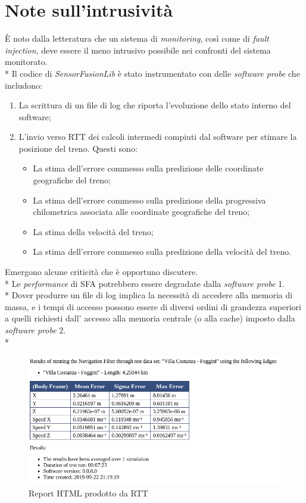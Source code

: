 \section{Note sull'intrusivit\`a}
\`E noto dalla letteratura che un sistema di \emph{monitoring}, cos\`i come di \emph{fault injection}, deve essere il meno intrusivo possibile nei confronti del sistema monitorato.\\*
Il codice di \emph{SensorFusionLib} \`e stato instrumentato con delle \emph{software probe} che includono:
\begin{enumerate}
	\item La scrittura di un file di log che riporta l'evoluzione dello stato interno del software;
	\item L'invio verso RTT dei calcoli intermedi compiuti dal software per stimare la posizione del treno. Questi sono:
	\begin{itemize}
		\item La stima dell'errore commesso sulla predizione delle coordinate geografiche del treno;
		\item La stima dell'errore commesso sulla predizione della progressiva chilometrica associata alle coordinate geografiche del treno;
		\item La stima della velocit\`a del treno;
		\item La stima dell'errore commesso sulla predizione della velocit\`a del treno.
	\end{itemize}
\end{enumerate}
Emergono alcune criticit\`a che \`e opportuno discutere.\\*
Le \emph{performance} di SFA potrebbero essere degradate dalla \emph{software probe} 1.\\*
Dover produrre un file di log implica la necessit\`a di accedere alla memoria di massa, e i tempi di accesso
possono essere di diversi ordini di grandezza superiori a quelli richiesti dall' accesso alla memoria centrale (o alla cache) imposto dalla \emph{software probe} 2.\\*
\begin{figure}[h]
	\centering
	\includegraphics[width=0.7\linewidth]{img/rttreport}
	\caption{Report HTML prodotto da RTT}
	\label{fig:rttreport}
\end{figure}

